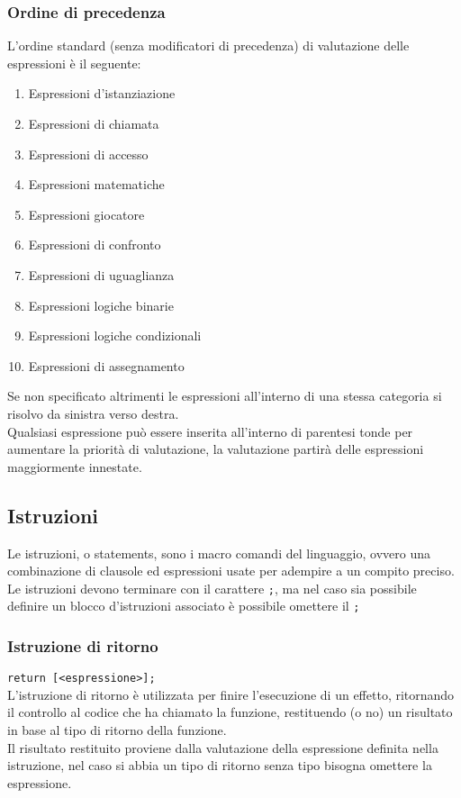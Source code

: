 \subsubsection{Ordine di precedenza}
L'ordine standard (senza modificatori di precedenza) di valutazione delle espressioni è il seguente:
\begin{enumerate}
    \item Espressioni d'istanziazione
    \item Espressioni di chiamata
    \item Espressioni di accesso
    \item Espressioni matematiche
    \item Espressioni giocatore
    \item Espressioni di confronto
    \item Espressioni di uguaglianza 
    \item Espressioni logiche binarie 
    \item Espressioni logiche condizionali 
    \item Espressioni di assegnamento
\end{enumerate}
Se non specificato altrimenti le espressioni all'interno di una stessa categoria 
si risolvo da sinistra verso destra. \\
Qualsiasi espressione può essere inserita all'interno di parentesi tonde per aumentare 
la priorità di valutazione, la valutazione partirà delle espressioni maggiormente innestate.

\newpage
\subsection{Istruzioni}
Le istruzioni, o statements, sono i macro comandi del linguaggio, ovvero una combinazione 
di clausole ed espressioni usate per adempire a un compito preciso.
Le istruzioni devono terminare con il carattere \lstinline|;|, ma nel caso sia possibile definire
un blocco d'istruzioni associato è possibile omettere il \lstinline|;|

\subsubsection{Istruzione di ritorno}
\lstinline|return [<espressione>];| \\
L’istruzione di ritorno è utilizzata per finire l’esecuzione di un effetto,
ritornando il controllo al codice che ha chiamato la funzione,
restituendo (o no) un risultato in base al tipo di ritorno della funzione. \\
Il risultato restituito proviene dalla valutazione della espressione definita nella istruzione,
nel caso si abbia un tipo di ritorno senza tipo bisogna omettere la espressione.

